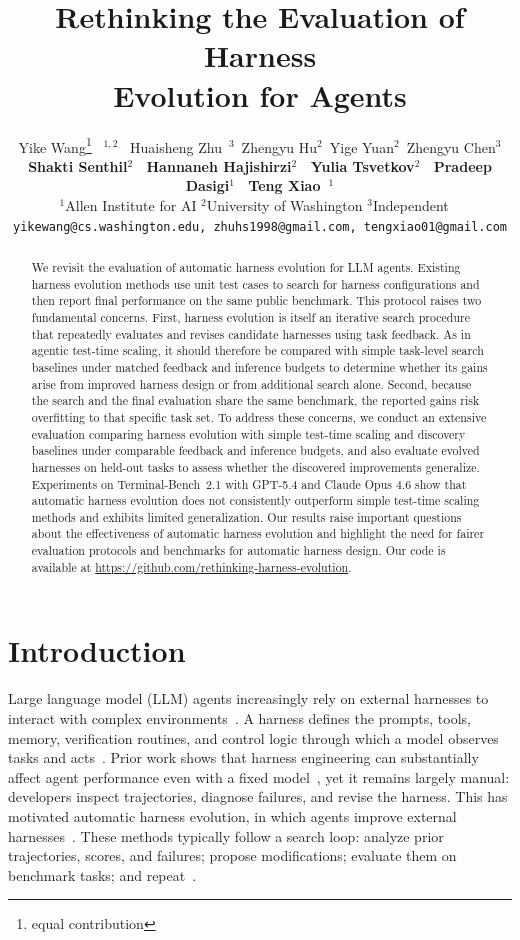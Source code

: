 \documentclass{article}
\title{Rethinking the Evaluation of Harness \\ Evolution  for Agents}
\author{%
    Yike Wang\thanks{equal contribution} \ $^{1,2}$ \
    Huaisheng Zhu\footnotemark[1] \ $^3$\
    Zhengyu Hu$^2$\
    Yige Yuan$^2$\
    Zhengyu Chen$^3$ \\
    \textbf{
   Shakti Senthil$^2$ \ Hannaneh Hajishirzi$^2$ \ Yulia Tsvetkov$^2$ \ Pradeep Dasigi$^1$ \ Teng Xiao\footnotemark[1] \ $^1$} \\ 
    \;$^1$Allen Institute for AI\;
    $^2$University of Washington\;
    $^3$Independent \ \\
    \texttt{yikewang@cs.washington.edu, zhuhs1998@gmail.com, tengxiao01@gmail.com}
}
\begin{document}
\maketitle


\begin{abstract}
 We revisit the evaluation of automatic harness evolution for LLM agents. Existing harness evolution methods use unit test cases to search for harness configurations and then report final performance on the same public benchmark. This protocol raises two fundamental concerns. First, harness evolution is itself an iterative search procedure that repeatedly evaluates and revises candidate harnesses using task feedback. As in agentic test-time scaling, it should therefore be compared with simple task-level search baselines under matched feedback and inference budgets to determine whether its gains arise from improved harness design or from additional search alone. Second, because the search and the final evaluation share the same benchmark, the reported gains risk overfitting to that specific task set. To address these concerns, we conduct an extensive evaluation comparing harness evolution with simple test-time scaling and discovery baselines under comparable feedback and inference budgets, and also evaluate evolved harnesses on held-out tasks to assess whether the discovered improvements generalize. Experiments on Terminal-Bench~2.1 with GPT-5.4 and Claude Opus 4.6 show that automatic harness evolution does not consistently outperform simple test-time scaling methods and exhibits limited generalization. Our results raise important questions about the effectiveness of automatic harness evolution and highlight the need for fairer evaluation protocols and benchmarks for automatic harness design. Our code is available at \url{https://github.com/rethinking-harness-evolution}.
\end{abstract}


\section{Introduction}
Large language model (LLM) agents increasingly rely on external harnesses to interact with complex environments~\citep{yang2024swe, merrill2026terminal}. A harness defines the prompts, tools, memory, verification routines, and control logic through which a model observes tasks and acts~\citep{lopopoloHarnessEngineeringLeveraging2026}. Prior work shows that harness engineering can substantially affect agent performance even with a fixed model~\citep{trivedyImprovingDeepAgents2026}, yet it remains largely manual: developers inspect trajectories, diagnose failures, and revise the harness. This has motivated automatic harness evolution, in which agents improve external harnesses~\citep{leeMetaHarnessEndtoEndOptimization2026, lin2026agentic, zhang2026harnessing}. These methods typically follow a search loop: analyze prior trajectories, scores, and failures; propose modifications; evaluate them on benchmark tasks; and repeat~\citep{leeMetaHarnessEndtoEndOptimization2026, zhang2026harnessing}.
\end{document}

